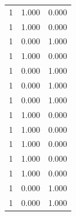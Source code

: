 \begin{tabular}{rrr}
1 & 1.000 & 0.000 \\
1 & 1.000 & 0.000 \\
1 & 0.000 & 1.000 \\
1 & 1.000 & 0.000 \\
1 & 0.000 & 1.000 \\
1 & 0.000 & 1.000 \\
1 & 0.000 & 1.000 \\
1 & 1.000 & 0.000 \\
1 & 1.000 & 0.000 \\
1 & 1.000 & 0.000 \\
1 & 1.000 & 0.000 \\
1 & 1.000 & 0.000 \\
1 & 0.000 & 1.000 \\
1 & 0.000 & 1.000 \\
\bottomrule
\end{tabular}

